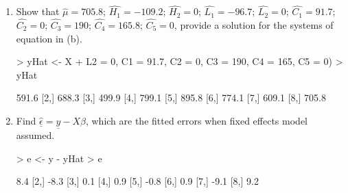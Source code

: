\documentclass[12pt,a4paper]{paper}
\begin{document}
\begin{enumerate}
\begin{enumerate}
\[\begin{array}{cccccccc}
1 & 1 & 1 & 1 & 1 & 1 & 1 & 1 \\ 
  1 & 1 & 1 & 0 & 0 & 0 & 0 & 0 \\ 
  1 & 0 & 1 & 1 & 0 & 1 & 1 & 0 \\ 
  1 & 1 & 0 & 0 & 0 & 0 & 0 & 0 \\ 
  0 & 0 & 1 & 0 & 0 & 0 & 0 & 0 \\ 
  0 & 0 & 0 & 1 & 1 & 0 & 0 & 0 \\ 
  0 & 0 & 0 & 0 & 0 & 1 & 0 & 0 \\ 
  0 & 0 & 0 & 0 & 0 & 0 & 1 & 1 \\ 
  \end{array}\right]\left[\begin{array}{c}600 \\ 
  680 \\ 
  500 \\ 
  800 \\ 
  895 \\ 
  775 \\ 
  600 \\ 
  715 \\ \end{array}\right]
\]
\item Show that $\hat{\mu} = 705.8$; $\hat{H_{1}} = -109.2$; $\hat{H_{2}} = 0$; $\hat{L_{1}} = -96.7$; $\hat{L_{2}} = 0$; $\hat{C_{1}} = 91.7$; $\hat{C_{2}} = 0$; $\hat{C_{3}} = 190$; $\hat{C_{4}} = 165.8$; $\hat{C_{5}} = 0$, provide a solution for the systems of equation in (b).
\begin{Schunk}
\begin{Sinput}
> yHat <- X %*% c(mu = 705.8, H1 = -109.2, H2 = 0, L1 = -96.7,
+         L2 = 0, C1 = 91.7, C2 = 0, C3 = 190, C4 = 165, C5 = 0)
> yHat
\end{Sinput}
\begin{Soutput}
      [,1]
[1,] 591.6
[2,] 688.3
[3,] 499.9
[4,] 799.1
[5,] 895.8
[6,] 774.1
[7,] 609.1
[8,] 705.8
\end{Soutput}
\end{Schunk}
\item Find $\underline{\hat{\epsilon}} = \underline{y} - X\beta$, which are the fitted errors when fixed effects model assumed.
\begin{Schunk}
\begin{Sinput}
> e <- y - yHat
> e
\end{Sinput}
\begin{Soutput}
     [,1]
[1,]  8.4
[2,] -8.3
[3,]  0.1
[4,]  0.9
[5,] -0.8
[6,]  0.9
[7,] -9.1
[8,]  9.2
\end{Soutput}

\end{Schunk}
\end{enumerate}
\end{enumerate}
\end{document}
